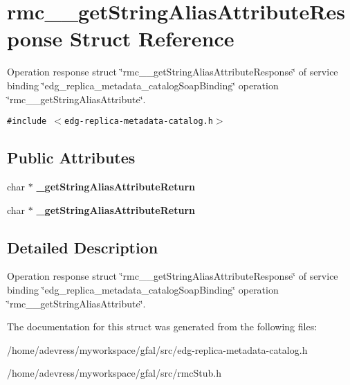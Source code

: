 \section{rmc\_\-\_\-get\-String\-Alias\-Attribute\-Response Struct Reference}
\label{structrmc____getStringAliasAttributeResponse}
Operation response struct \char`\"{}rmc\_\-\_\-get\-String\-Alias\-Attribute\-Response\char`\"{} of service binding \char`\"{}edg\_\-replica\_\-metadata\_\-catalog\-Soap\-Binding\char`\"{} operation \char`\"{}rmc\_\-\_\-get\-String\-Alias\-Attribute\char`\"{}.  


{\tt \#include $<$edg-replica-metadata-catalog.h$>$}

\subsection*{Public Attributes}
\begin{CompactItemize}
\item 
char $\ast$ \textbf{\_\-get\-String\-Alias\-Attribute\-Return}\label{structrmc____getStringAliasAttributeResponse_c843a0d9d7bc38b3a66a975e153b1c22}

\item 
char $\ast$ \textbf{\_\-get\-String\-Alias\-Attribute\-Return}\label{structrmc____getStringAliasAttributeResponse_c843a0d9d7bc38b3a66a975e153b1c22}

\end{CompactItemize}


\subsection{Detailed Description}
Operation response struct \char`\"{}rmc\_\-\_\-get\-String\-Alias\-Attribute\-Response\char`\"{} of service binding \char`\"{}edg\_\-replica\_\-metadata\_\-catalog\-Soap\-Binding\char`\"{} operation \char`\"{}rmc\_\-\_\-get\-String\-Alias\-Attribute\char`\"{}. 



The documentation for this struct was generated from the following files:\begin{CompactItemize}
\item 
/home/adevress/myworkspace/gfal/src/edg-replica-metadata-catalog.h\item 
/home/adevress/myworkspace/gfal/src/rmc\-Stub.h\end{CompactItemize}
